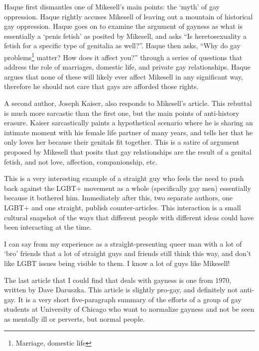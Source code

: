 \documentclass[a4paper,12pt]{article}
\begin{document}
	Haque first dismantles one of Mikesell's main points: the `myth' of gay oppression. Haque rightly accuses Mikesell of leaving out a mountain of historical gay oppression. Haque goes on to examine the argument of gayness as what is essentially a `penis fetish' as posited by Mikesell, and asks ``Is heretosexuality a fetish for a specific type of genitalia as well?''. Haque then asks, ``Why do gay problems\footnote{Marriage, domestic life} matter? How does it affect you?'' through a series of questions that address the role of marriages, domestic life, and private gay relationships. Haque argues that none of these will likely ever affect Mikesell in any significant way, therefore he should not care that gays are afforded those rights.
	
	A second author, Joseph Kaiser, also responds to Mikesell's article. \cite{counterantigay2} This rebuttal is much more sarcastic than the first one, but the main points of anti-history erasure. Kaiser sarcastically paints a hypothetical scenario where he is sharing an intimate moment with his female life partner of many years, and tells her that he only loves her because their genitals fit together. This is a satire of argument proposed by Mikesell that posits that gay relationships are the result of a genital fetish, and not love, affection, companionship, etc.

	This is a very interesting example of a straight guy who feels the need to push back against the LGBT+ movement as a whole (specifically gay men) essentially because it bothered him. Immediately after this, two separate authors, one LGBT+ and one straight, publish counter-articles. This interaction is a small cultural snapshot of the ways that different people with different ideas could have been interacting at the time. 
	
	I can say from my experience as a straight-presenting queer man with a lot of `bro' friends that a lot of straight guys and friends still think this way, and don't like LGBT issues being visible to them. I know a lot of guys like Mikesell!

	The last article that I could find that deals with gayness is one from 1970, written by Dave Daruszka.\cite{progayold} This article is slightly pro-gay, and definitely not anti-gay. It is a very short five-paragraph summary of the efforts of a group of gay students at University of Chicago who want to normalize gayness and not be seen as mentally ill or perverts, but normal people. 

\newpage
\end{document}
